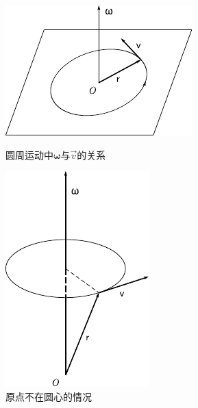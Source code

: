 \begin{figure}[!h]
    \small
    \begin{minipage}[b]{15em}
        \centering
        \includegraphics{figure/fig01.20}
        \vspace{4em}
        \caption{圆周运动中$ \symbf{\omega}$与$\vec{v}$的关系}
        \label{fig:01.20}
    \end{minipage}
    \hfill
    \begin{minipage}[b]{13em}
        \centering
        \includegraphics{figure/fig01.21}
        \vspace{1em}
        \caption{原点不在圆心的情况}
        \label{fig:01.21}
\end{minipage}
\end{figure}

